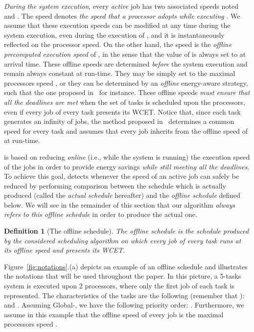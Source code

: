 \documentclass[times, 10pt,twocolumn]{article}
\newcommand{\mora}{\mbox{\textsf{MORA}}}
\newtheorem{Definition}{Definition}
\begin{document}
\Section{The Multiprocessor Online Reclaiming Algorithm (\mora)}
\label{sec:mora} 

\label{sec:notations}
\emph{During the system execution}, every \emph{active} job  has two associated speeds noted  and . The speed  denotes \emph{the speed that a processor adopts while executing }. We assume that these execution speeds  can be modified at any time during the system execution, even during the execution of , and it is instantaneously reflected on the processor speed. On the other hand, the speed  is the \emph{offline precomputed execution speed} of , in the sense that the value of  is always set to  at  arrival time. These offline speeds  are determined \emph{before} the system execution and remain always constant at run-time. They may be simply set to the maximal processors speed , or they can be determined by an \emph{offline} energy-aware strategy, such that the one proposed in~\cite{Nelis:08} for instance. These offline speeds \emph{must ensure that all the deadlines are met} when the set of tasks is scheduled upon the  processors, even if every job of every task presents its WCET. Notice that, since each task generates an infinity of jobs, the method proposed in~\cite{Nelis:08} determines a common speed for every task and assumes that every job  inherits from the offline speed of  at run-time.

 is based on reducing \emph{online} (i.e., while the system is running) the execution speed  of the jobs in order to provide energy savings \emph{while still meeting all the deadlines}. To achieve this goal,  detects whenever the speed  of an active job  can safely be reduced by performing comparison between the schedule which is actually produced (called the \emph{actual schedule} hereafter) and the \emph{offline schedule} defined below. We will see in the remainder of this section that our algorithm  \emph{always refers to this offline schedule} in order to produce the actual one.

\begin{Definition}[The offline schedule]
The offline schedule is the schedule produced by the considered scheduling algorithm on which every job of every task  runs at its offline speed  and presents its WCET.
\end{Definition}

Figure~\ref{fig:notations}.(a) depicts an example of an offline schedule and illustrates the notations that will be used throughout the paper. In this picture, a 5-tasks system is executed upon 2 processors, where only the first job of each task is represented. The characteristics of the tasks are the following (remember that ):  and . Assuming Global-, we have the following priority order: . Furthermore, we assume in this example that the offline speed  of every job  is the maximal processors speed .
\end{document}
